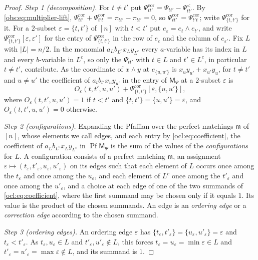 \documentclass[11pt]{amsart}
\theoremstyle{definition}
\theoremstyle{remark}
\numberwithin{equation}{section}
\newcommand{\abs}[1]{\lvert #1\rvert}
\theoremstyle{plain}
\theoremstyle{definition}
\theoremstyle{plain}
\begin{document}
\begin{proof}
\emph{Step 1 (decomposition).} For $t\ne t'$ put $\Psi^{\mathrm{cor}}_{tt'}=\Psi_{tt'}-\Psi^<_{tt'}$. By
\eqref{obs:eq:multiplier-lift}, $\Psi^{\mathrm{cor}}_{tt'}+\Psi^{\mathrm{cor}}_{t't}=\pi_{tt'}-\pi_{tt'}=0$, so
$\Psi^{\mathrm{cor}}_{tt'}=\Psi^{\mathrm{cor}}_{t't}$; write $\Psi^{\mathrm{cor}}_{\{t,t'\}}$ for it. For a $2$-subset
$\varepsilon=\{t,t'\}$ of $[n]$ with $t<t'$ put $e_\varepsilon=e_t\wedge e_{t'}$, and write
$\Psi^{\mathrm{cor}}_{\{t,t'\}}[\varepsilon,\varepsilon']$ for the entry of $\Psi^{\mathrm{cor}}_{\{t,t'\}}$ in the row of
$e_\varepsilon$ and the column of $e_{\varepsilon'}$. Fix $L$ with $\abs L=n/2$. In the monomial $a_Lb_{L^c}x_Ly_{L^c}$
every $a$-variable has its index in $L$ and every $b$-variable in $L^c$, so only the $\Psi_{tt'}$ with $t\in L$ and
$t'\in L^c$, in particular $t\ne t'$, contribute. As the coordinate of $x\wedge y$ at $e_{\{u,u'\}}$ is
$x_uy_{u'}+x_{u'}y_u$, for $t\ne t'$ and $u\ne u'$ the coefficient of $a_tb_{t'}x_uy_{u'}$ in the entry of
$\mathsf M_\Psi$ at a $2$-subset $\varepsilon$ is
\begin{equation}\label{ocl:eq:coefficient}
O_\varepsilon(t,t',u,u')+\Psi^{\mathrm{cor}}_{\{t,t'\}}[\varepsilon,\{u,u'\}],
\end{equation}
where $O_\varepsilon(t,t',u,u')=1$ if $t<t'$ and $\{t,t'\}=\{u,u'\}=\varepsilon$, and $O_\varepsilon(t,t',u,u')=0$
otherwise.

\emph{Step 2 (configurations).} Expanding the Pfaffian over the perfect matchings $\mathfrak m$ of $[n]$, whose elements
we call edges, and each entry by \eqref{ocl:eq:coefficient}, the coefficient of $a_Lb_{L^c}x_Ly_{L^c}$ in
$\operatorname{Pf}\mathsf M_\Psi$ is the sum of the values of the \emph{configurations} for $L$. A configuration
consists of a perfect matching $\mathfrak m$, an assignment $\varepsilon\mapsto(t_\varepsilon,t'_\varepsilon,
u_\varepsilon,u'_\varepsilon)$ on its edges such that each element of $L$ occurs once among the $t_\varepsilon$ and once
among the $u_\varepsilon$, and each element of $L^c$ once among the $t'_\varepsilon$ and once among the
$u'_\varepsilon$, and a choice at each edge of one of the two summands of \eqref{ocl:eq:coefficient}, where the first
summand may be chosen only if it equals $1$. Its value is the product of the chosen summands. An edge is an
\emph{ordering edge} or a \emph{correction edge} according to the chosen summand.

\emph{Step 3 (ordering edges).} An ordering edge $\varepsilon$ has
$\{t_\varepsilon,t'_\varepsilon\}=\{u_\varepsilon,u'_\varepsilon\}=\varepsilon$ and $t_\varepsilon<t'_\varepsilon$. As
$t_\varepsilon,u_\varepsilon\in L$ and $t'_\varepsilon,u'_\varepsilon\notin L$, this forces
$t_\varepsilon=u_\varepsilon=\min\varepsilon\in L$ and $t'_\varepsilon=u'_\varepsilon=\max\varepsilon\notin L$, and its
summand is $1$.


\end{proof}
\end{document}

